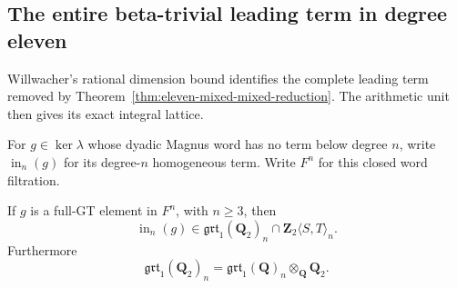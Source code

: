 \subsection{The entire beta-trivial leading term in degree eleven}
\label{subsec:eleven-completeness}

Willwacher's rational dimension bound identifies the complete leading
term removed by Theorem~\ref{thm:eleven-mixed-mixed-reduction}. The
arithmetic unit then gives its exact integral lattice.

For $g\in\ker\lambda$ whose dyadic Magnus word has no term below
degree $n$, write $\operatorname{in}_n(g)$ for its degree-$n$
homogeneous term. Write $F^n$ for this closed word filtration.

\begin{lemma}\label{lem:full-gt-leading-term}
If $g$ is a full-GT element in $F^n$, with $n\ge3$, then
\[
 \operatorname{in}_n(g)\in
 \mathfrak{grt}_1(\mathbf Q_2)_n
       \cap\mathbf Z_2\langle S,T\rangle_n.
\]
Furthermore
\[
 \mathfrak{grt}_1(\mathbf Q_2)_n
  =\mathfrak{grt}_1(\mathbf Q)_n\otimes_{\mathbf Q}\mathbf Q_2.
\]
\end{lemma}

